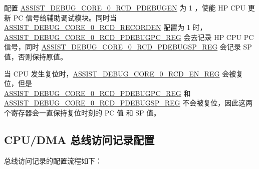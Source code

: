 \documentclass[main\_\_CN.tex]{subfiles}
\begin{document}
配置 \hyperref[fielddesc:ASSISTDEBUGCORE0RCDPDEBUGEN]{ASSIST\_DEBUG\_CORE\_0\_RCD\_PDEBUGEN} 为 1 ，使能 HP CPU 更新 PC 信号给辅助调试模块。同时当 \hyperref[fielddesc:ASSISTDEBUGCORE0RCDRECORDEN]{ASSIST\_DEBUG\_CORE\_0\_RCD\_RECORDEN} 配置为 1 时，\\\hyperref[regdesc:ASSISTDEBUGCORE0RCDPDEBUGPCREG]{ASSIST\_DEBUG\_CORE\_0\_RCD\_PDEBUGPC\_REG} 会去记录 HP CPU PC 信号，同时 \hyperref[regdesc:ASSISTDEBUGCORE0RCDPDEBUGSPREG]{ASSIST\_DEBUG\_CORE\_0\_RCD\_PDEBUGSP\_REG} 会记录 SP 值，否则保持原值。

当 CPU 发生复位时，\hyperref[regdesc:ASSISTDEBUGCORE0RCDENREG]{ASSIST\_DEBUG\_CORE\_0\_RCD\_EN\_REG} 会被复位，但是\\ \hyperref[regdesc:ASSISTDEBUGCORE0RCDPDEBUGPCREG]{ASSIST\_DEBUG\_CORE\_0\_RCD\_PDEBUGPC\_REG} 和 \hyperref[regdesc:ASSISTDEBUGCORE0RCDPDEBUGSPREG]{ASSIST\_DEBUG\_CORE\_0\_RCD\_PDEBUGSP\_REG} 不会被复位，因此这两个寄存器会一直保持复位时刻的 PC 值 和 SP 值。

\subsection{CPU/DMA 总线访问记录配置}
总线访问记录的配置流程如下：
\end{document}
